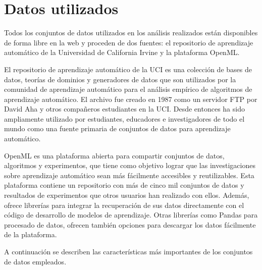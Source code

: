 \section{Datos utilizados}
\label{sec:datasets}


Todos los conjuntos de datos utilizados en los análisis realizados están disponibles de forma libre en la web y proceden de dos fuentes: el repositorio de aprendizaje automático de la Universidad de California Irvine y la plataforma OpenML.

El repositorio de aprendizaje automático de la UCI \cite{ml-uci} es una colección de bases de datos, teorías de dominios y generadores de datos que son utilizados por la comunidad de aprendizaje automático para el análisis empírico de algoritmos de aprendizaje automático. El archivo fue creado en 1987 como un servidor FTP por David Aha y otros compañeros estudiantes en la UCI. Desde entonces ha sido ampliamente utilizado por estudiantes, educadores e investigadores de todo el mundo como una fuente primaria de conjuntos de datos para aprendizaje automático.

OpenML \cite{openml} es una plataforma abierta para compartir conjuntos de datos, algoritmos y experimentos, que tiene como objetivo lograr que las investigaciones sobre aprendizaje automático sean más fácilmente accesibles y reutilizables. Esta plataforma contiene un repositorio con más de cinco mil conjuntos de datos y resultados de experimentos que otros usuarios han realizado con ellos. Además, ofrece librerías para integrar la recuperación de sus datos directamente con el código de desarrollo de modelos de aprendizaje. Otras librerías como Pandas para procesado de datos, ofrecen también opciones para descargar los datos fácilmente de la plataforma.

A continuación se describen las características más importantes de los conjuntos de datos empleados.

